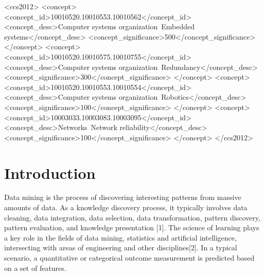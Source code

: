 \documentclass{sig-alternate-05-2015}
\begin{document}
%
%
\begin{CCSXML}
<ccs2012>
 <concept>
  <concept_id>10010520.10010553.10010562</concept_id>
  <concept_desc>Computer systems organization~Embedded systems</concept_desc>
  <concept_significance>500</concept_significance>
 </concept>
 <concept>
  <concept_id>10010520.10010575.10010755</concept_id>
  <concept_desc>Computer systems organization~Redundancy</concept_desc>
  <concept_significance>300</concept_significance>
 </concept>
 <concept>
  <concept_id>10010520.10010553.10010554</concept_id>
  <concept_desc>Computer systems organization~Robotics</concept_desc>
  <concept_significance>100</concept_significance>
 </concept>
 <concept>
  <concept_id>10003033.10003083.10003095</concept_id>
  <concept_desc>Networks~Network reliability</concept_desc>
  <concept_significance>100</concept_significance>
 </concept>
</ccs2012>  
\end{CCSXML}



%
%

%
%
\printccsdesc



\section{Introduction}
Data mining is the process of discovering interesting patterns from massive amounts of data. As a knowledge discovery process, it typically involves data cleaning, data integration, data selection, data transformation, pattern discovery, pattern evaluation, and knowledge presentation [1]. The science of learning plays a key role in the fields of data mining, statistics and artificial intelligence, intersecting with areas of engineering and other disciplines[2].  In a typical scenario, a quantitative or categorical outcome measurement is predicted based on a set of features.
\end{document}
